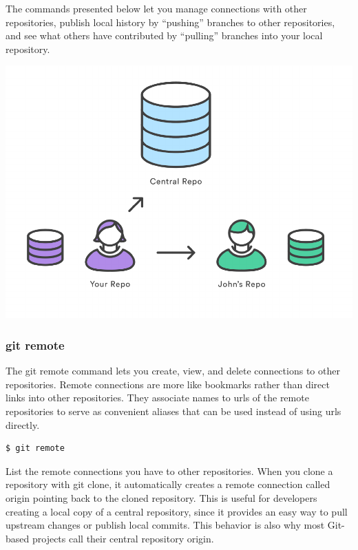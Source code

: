 \documentclass{article}
\begin{document}
The commands presented below let you manage connections with other
repositories, publish local history by ``pushing'' branches to other
repositories, and see what others have contributed by ``pulling''
branches into your local repository.

\begin{center}
\includegraphics[scale=0.5]{figures/06.pdf}
\end{center}

\subsubsection*{git remote}

The git remote command lets you create, view, and delete connections
to other repositories. Remote connections are more like bookmarks
rather than direct links into other repositories. They associate names
to urls of the remote repositories to serve as convenient aliases
that can be used instead of using urls directly.

\begin{lstlisting}
$ git remote
\end{lstlisting}

List the remote connections you have to other repositories.
When you clone a repository with git clone, it automatically creates a
remote connection called origin pointing back to the cloned
repository. This is useful for developers creating a local copy of a
central repository, since it provides an easy way to pull upstream
changes or publish local commits. This behavior is also why most
Git-based projects call their central repository origin.
\end{document}
